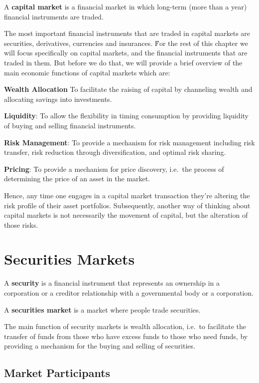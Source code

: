 A \textbf{capital market} is a financial market in which long-term (more than a year) financial instruments are traded.
\ed

The most important financial instruments that are traded in capital markets are securities, derivatives, currencies and
insurances. \v

For the rest of this chapter we will focus specifically on capital markets, and the financial instruments that are
traded in them. But before we do that, we will provide a brief overview of the main economic functions of capital
markets which are:
\bit
\item \textbf{Wealth Allocation} To facilitate the raising of capital by channeling wealth and allocating savings into
investments.
\item \textbf{Liquidity}: To allow the flexibility in timing consumption by providing liquidity of buying and selling
financial instruments.
\item \textbf{Risk Management}: To provide a mechanism for risk management including risk transfer, risk reduction
through diversification, and optimal risk sharing.
\item \textbf{Pricing}: To provide a mechanism for price discovery, i.e.\ the process of determining the price of an
asset in the market.
\eit

Hence, any time one engages in a capital market transaction they're altering the risk profile of their asset portfolios.
Subsequently, another way of thinking about capital markets is not necessarily the movement of capital, but the
alteration of those risks.

\section{Securities Markets}

\bd[Security]
A \textbf{security} is a financial instrument that represents an ownership in a corporation or a creditor relationship
with a governmental body or a corporation.
\ed

A \textbf{securities market} is a market where people trade securities.
\ed

The main function of security markets is wealth allocation, i.e.\ to facilitate the transfer of funds from those who
have excess funds to those who need funds, by providing a mechanism for the buying and selling of securities.

\subsection{Market Participants}


